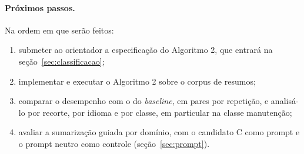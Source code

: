 \documentclass[12pt]{article}
\begin{document}
\paragraph{Próximos passos.} Na ordem em que serão feitos:

\begin{enumerate}
\item submeter ao orientador a especificação do Algoritmo 2, que entrará na
  seção~\ref{sec:classificacao};
\item implementar e executar o Algoritmo 2 sobre o corpus de resumos;
\item comparar o desempenho com o do \textit{baseline}, em pares por
  repetição, e analisá-lo por recorte, por idioma e por classe, em particular
  na classe manutenção;
\item avaliar a sumarização guiada por domínio, com o candidato C como prompt e
  o prompt neutro como controle (seção~\ref{sec:prompt}).
\end{enumerate}
\end{document}
